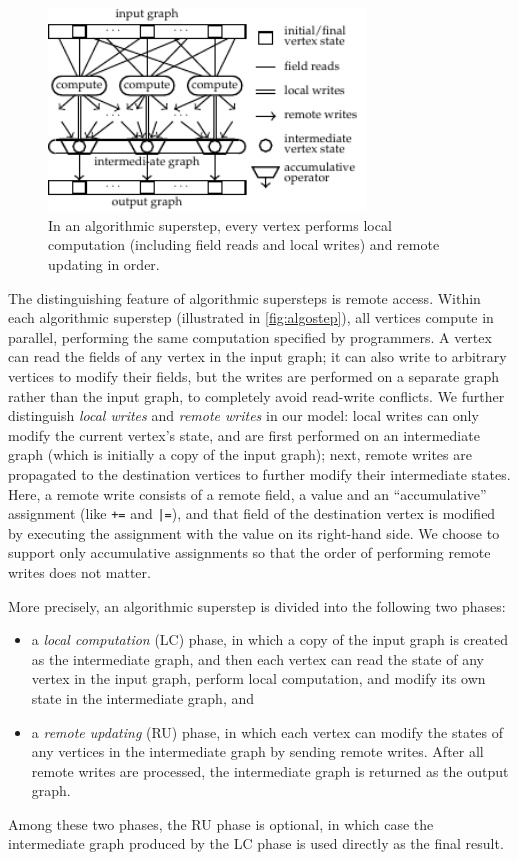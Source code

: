\documentclass{sokendai_thesis} %
\begin{document}
\begin{figure}[t]
 \centering
 \includegraphics[width=0.75\textwidth]{figures/model.pdf}
 \caption{In an algorithmic superstep, every vertex performs local computation (including field reads and local writes) and remote updating in order.}
 \label{fig:algostep}
 \vspace{-2.5ex}
\end{figure}

The distinguishing feature of algorithmic supersteps is remote access.
Within each algorithmic superstep (illustrated in \autoref{fig:algostep}), all vertices compute in parallel, performing the same computation specified by programmers.
A vertex can read the fields of any vertex in the input graph; it can also write to arbitrary vertices to modify their fields, but the writes are performed on a separate graph rather than the input graph, to completely avoid read-write conflicts.
We further distinguish \emph{local writes} and \emph{remote writes} in our model:
local writes can only modify the current vertex's state, and are first performed on an intermediate graph (which is initially a copy of the input graph);
next, remote writes are propagated to the destination vertices to further modify their intermediate states.
Here, a remote write consists of a remote field, a value and an ``accumulative'' assignment (like \texttt{+=} and \texttt{|=}), and that field of the destination vertex is modified by executing the assignment with the value on its right-hand side.
We choose to support only accumulative assignments so that the order of performing remote writes does not matter.

More precisely, an algorithmic superstep is divided into the following two phases:
\begin{itemize}\setlength\itemsep{0em}
 \item a \emph{local computation} (LC) phase, in which a copy of the input graph is created as the intermediate graph, and then each vertex can read the state of any vertex in the input graph, perform local computation, and modify its own state in the intermediate graph, and
 \item a \emph{remote updating} (RU) phase, in which each vertex can modify the states of any vertices in the intermediate graph by sending remote writes.
 After all remote writes are processed, the intermediate graph is returned as the output graph.
\end{itemize}
Among these two phases, the RU phase is optional, in which case the intermediate graph produced by the LC phase is used directly as the final result.
\end{document}
